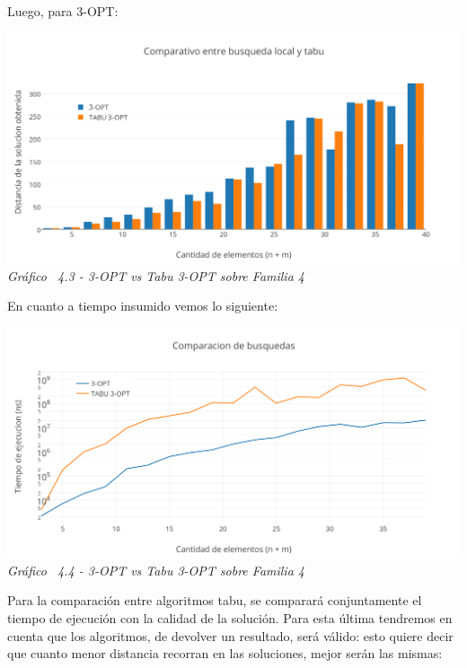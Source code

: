Luego, para 3-OPT:

\vspace*{0.3cm} \vspace*{0.3cm}
  \begin{center}
 \includegraphics[scale=0.5]{./EJ4/comparativogym03opt.png}\\
 {            \textit{Gráfico \ 4.3 - 3-OPT vs Tabu 3-OPT sobre Familia 4}}
  \end{center}
  \vspace*{0.3cm}

En cuanto a tiempo insumido vemos lo siguiente:

\vspace*{0.3cm} \vspace*{0.3cm}
  \begin{center}
 \includegraphics[scale=0.5]{./EJ4/medicion3optgym0.png}\\
 {            \textit{Gráfico \ 4.4 - 3-OPT vs Tabu 3-OPT sobre Familia 4}}
  \end{center}
  \vspace*{0.3cm}
  
Para la comparación entre algoritmos tabu, se comparará conjuntamente el tiempo de ejecución con la calidad de la solución. Para esta última tendremos en cuenta que los algoritmos, de devolver un resultado, será válido: esto quiere decir que cuanto menor distancia recorran en las soluciones, mejor serán las mismas:

